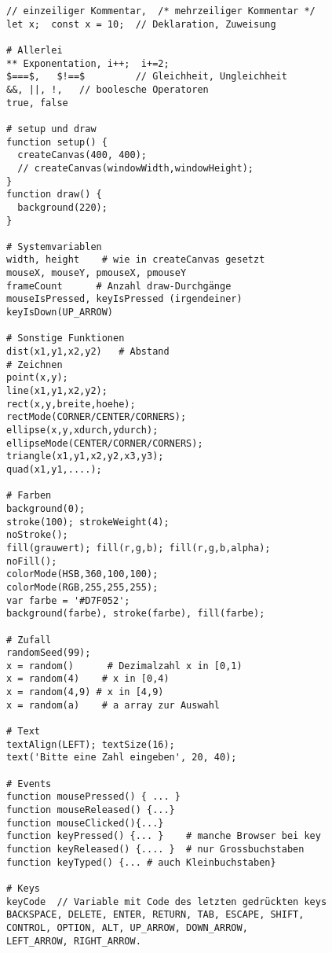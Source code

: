 \documentclass[a4paper,11pt,landscape,twocolumn]{book}
\begin{document}
\parskip 4pt
\thispagestyle{ErsteSeite}
\footnotesize
\lstset{tabsize=4, basicstyle=\footnotesize, showstringspaces=false,mathescape=true}

\begin{lstlisting} 
// einzeiliger Kommentar,  /* mehrzeiliger Kommentar */ 
let x;  const x = 10;  // Deklaration, Zuweisung 

# Allerlei
** Exponentation, i++;  i+=2;
$===$,   $!==$         // Gleichheit, Ungleichheit
&&, ||, !,   // boolesche Operatoren
true, false

# setup und draw
function setup() {             
  createCanvas(400, 400);
  // createCanvas(windowWidth,windowHeight);   
}
function draw() {
  background(220);
} 

# Systemvariablen
width, height    # wie in createCanvas gesetzt
mouseX, mouseY, pmouseX, pmouseY
frameCount      # Anzahl draw-Durchgänge
mouseIsPressed, keyIsPressed (irgendeiner)
keyIsDown(UP_ARROW)

# Sonstige Funktionen
dist(x1,y1,x2,y2)   # Abstand  
# Zeichnen
point(x,y);
line(x1,y1,x2,y2);
rect(x,y,breite,hoehe);
rectMode(CORNER/CENTER/CORNERS);
ellipse(x,y,xdurch,ydurch);
ellipseMode(CENTER/CORNER/CORNERS);
triangle(x1,y1,x2,y2,x3,y3);
quad(x1,y1,....);

# Farben
background(0); 
stroke(100); strokeWeight(4);
noStroke();
fill(grauwert); fill(r,g,b); fill(r,g,b,alpha);
noFill();
colorMode(HSB,360,100,100);
colorMode(RGB,255,255,255);
var farbe = '#D7F052';  
background(farbe), stroke(farbe), fill(farbe);

# Zufall
randomSeed(99);
x = random()      # Dezimalzahl x in [0,1)  
x = random(4)    # x in [0,4)
x = random(4,9) # x in [4,9)
x = random(a)    # a array zur Auswahl

# Text 
textAlign(LEFT); textSize(16);
text('Bitte eine Zahl eingeben', 20, 40);

# Events
function mousePressed() { ... }
function mouseReleased() {...}
function mouseClicked(){...}  
function keyPressed() {... }    # manche Browser bei key 
function keyReleased() {.... }  # nur Grossbuchstaben
function keyTyped() {... # auch Kleinbuchstaben}

# Keys
keyCode  // Variable mit Code des letzten gedrückten keys
BACKSPACE, DELETE, ENTER, RETURN, TAB, ESCAPE, SHIFT,
CONTROL, OPTION, ALT, UP_ARROW, DOWN_ARROW, 
LEFT_ARROW, RIGHT_ARROW.


\end{lstlisting}
\end{document}
